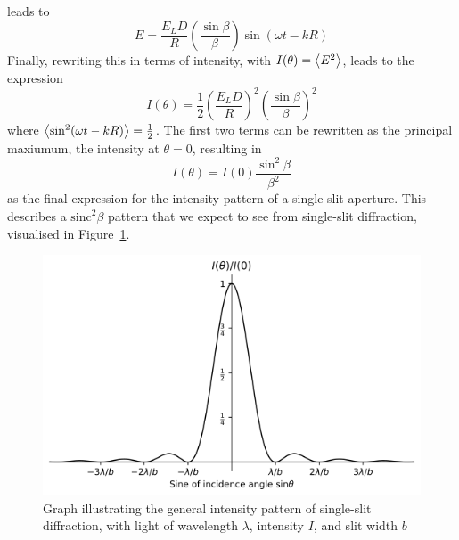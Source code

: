 \documentclass[a4paper]{article}
\begin{document}
leads to
\begin{equation}
  E=\frac{E_LD}R\left(\frac{\sin\beta}\beta\right)\sin(\omega t-kR)
\end{equation}
Finally, rewriting this in terms of intensity, with $I(\theta)=\expval{E^2}$, leads to the expression
\begin{equation}
  I(\theta)=\frac12\left(\frac{E_LD}R\right)^2\left(\frac{\sin\beta}\beta\right)^2
\end{equation} where $\expval{\sin^2(\omega t-kR)}=\frac12$. The first two terms can be rewritten as the principal maxiumum, the intensity at $\theta=0$, resulting in
\begin{equation} \label{eq:ss}
I(\theta)=I(0)\frac{\sin^2\beta}{\beta^2}
\end{equation}
as the final expression for the intensity pattern of a single-slit aperture. This describes a $\text{sinc}^2\beta$ pattern that we expect to see from single-slit diffraction, visualised in Figure~\ref{fig:singledemo}.
\begin{figure}[h]
  \centerline{\includegraphics[scale=0.7]{ss_demo.png}}
  \captionsetup{justification=centering}
  \caption{Graph illustrating the general intensity pattern of single-slit diffraction, with light of wavelength $\lambda$, intensity $I$, and slit width $b$}
  \label{fig:singledemo}
\end{figure}
\end{document}
